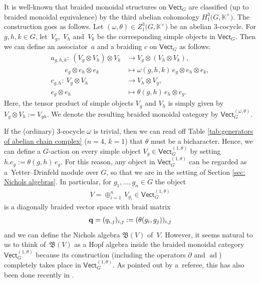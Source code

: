 \documentclass[10pt,a4paper]{amsart}
\numberwithin{equation}{section}
\newcommand{\qq }{{\bf q}}
\newcommand{\KK }{\mathbb{K}}
\newcommand{\BB }{\mathfrak{B}}
\DeclareMathOperator{\ad}{ad}
\begin{document}
It is well-known \cite[Example~8.4.8]{b-EGNO-15} that braided monoidal structures on $\mathsf{Vect}_G$ are classified (up to braided monoidal equivalence) by the third abelian cohomology $H^3_1\big(G,\KK^\times\big)$. The construction goes as follows. Let $(\omega,\theta) \in Z^3_1\big(G,\KK^\times\big)$ be an abelian 3-cocycle. For $g,h,k \in G$, let~$V_g$,~$V_h$ and~$V_k$ be the corresponding simple objects in $\mathsf{Vect}_G$. Then we can define an associator~$a$ and a braiding $c$ on $\mathsf{Vect}_G$ as follows:
\begin{align*}
 a_{g,h,k}\colon \ (V_g\otimes V_h) \otimes V_k &\longrightarrow V_g\otimes (V_h \otimes V_k),\\
 \qquad e_g\otimes e_h \otimes e_k &\longmapsto \omega(g,h,k) \, e_g\otimes e_h \otimes e_k,\\
 c_{g,h}\colon \ V_g \otimes V_h &\longrightarrow V_h \otimes V_g,\\
 e_g\otimes e_h &\longmapsto \theta( g,h)\, e_h \otimes e_g.
\end{align*}
Here, the tensor product of simple objects $V_g$ and $V_h$ is simply given by $V_g \otimes V_h := V_{gh}$. We denote the resulting braided monoidal category by $\mathsf{Vect}_G^{(\omega,\theta)}$.

If the (ordinary) 3-cocycle $\omega$ is trivial, then we can read off Table \ref{tab:generators of abelian chain complex} ($n=4$, $k=1$) that $\theta$ must be a bicharacter. Hence, we can define a $G$-action on every simple object $V_g \in \mathsf{Vect}_G^{(1,\theta)}$ by setting $h.e_g:=\theta(g,h)\,e_g$. For this reason, any object in $\mathsf{Vect}_G^{(1,\theta)}$ can be regarded as a~Yetter--Drinfeld module over $G$, so that we are in the setting of Section \ref{sec: Nichols algebras}. In particular, for $g_1, \dots, g_n \in G$ the object
\begin{align*}
 V=\oplus_{i=1}^n\,V_{g_i} \in \mathsf{Vect}_G^{(1,\theta)}
\end{align*}
is a diagonally braided vector space with braid matrix
\begin{align*}
 \qq = (q_{i,j})_{i,j} := (\theta(g_i,g_j))_{i,j}
\end{align*}
and we can define the Nichols algebra $\BB(V)$ of~$V$. However, it seems natural to us to think of~$\BB(V)$ as a Hopf algebra inside the braided monoidal category $\mathsf{Vect}_G^{(1,\theta)}$ because its construction (including the operators $\partial$ and $\ad$) completely takes place in $\mathsf{Vect}_G^{(1,\theta)}$.
As pointed out by a~referee, this has also been done recently in \cite[Section~5.2]{MR4498166}.
\end{document}
